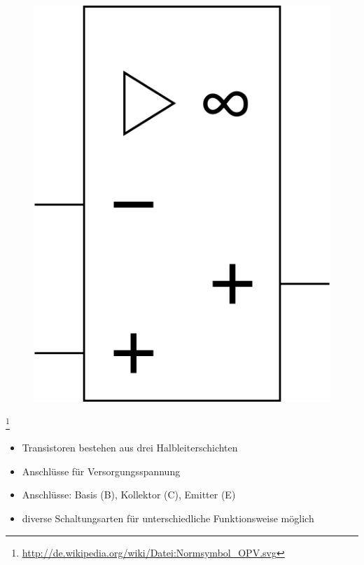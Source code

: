 \begin{frame}
\begin{minipage}{0.4\textwidth}
\begin{figure}
      \includegraphics[width=\textwidth,height=.5\textheight,keepaspectratio]{e13/OPV-ger.png}
    \end{figure}
\end{minipage}
\footnote{\url{http://de.wikipedia.org/wiki/Datei:Normsymbol_OPV.svg}}
\vspace{0.5cm}
\begin{center}
\begin{itemize}
      \item Transistoren bestehen aus drei Halbleiterschichten
      \item Anschlüsse für Versorgungsspannung
      \item Anschlüsse: Basis (B), Kollektor (C), Emitter (E)
      \item diverse Schaltungsarten für unterschiedliche Funktionsweise möglich
\end{itemize}
\end{center}
\end{frame}

